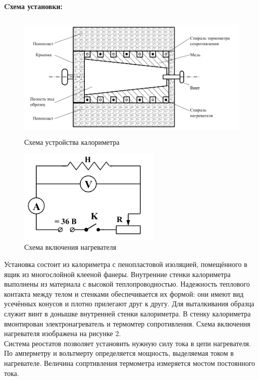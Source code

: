 \documentclass[a4paper]{article}
\begin{document}
	\paragraph{Cхема установки:}
	\begin{figure}[ht!]
		\centering
		\includegraphics[height=60mm]{pic1.png}
		\caption{Схема устройства калориметра}
	\end{figure}
	\begin{figure}[ht!]
		\centering
		\includegraphics[height=45mm]{pic2.png}
		\caption{Схема включения нагревателя}
	\end{figure}
	Установка состоит из калориметра с пенопластовой изоляцией, помещённого в ящик из многослойной клееной фанеры. Внутренние стенки калориметра выполнены из материала с высокой теплопроводностью. Надежность теплового контакта между телом и стенками обеспечивается их формой: они имеют вид усечённых конусов и плотно прилегают друг к другу. Для выталкивания образца служит винт в донышке внутренней стенки калориметра. В стенку калориметра вмонтирован электронагреватель и термомтер сопротивления. Схема включения нагревателя изображена на рисунке 2. \\
	Система реостатов позволяет установить нужную силу тока в цепи нагревателя. По амперметру и вольтмерту определяется мощность, выделяемая током в нагревателе. Величина сопртивления термометра измеряется мостом постоянного тока. 
\end{document}
